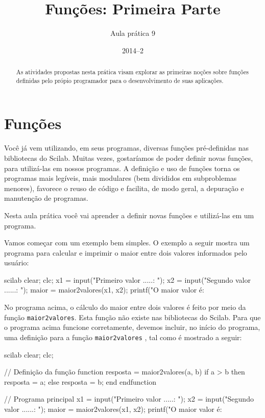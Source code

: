\documentclass[11pt]{practice}
\begin{document}
\subtitle{Aula prática 9}
\title{Funções: Primeira Parte}
\author{}
\date{2014--2}
\maketitle

\begin{abstract}
  As atividades propostas nesta prática visam explorar as primeiras
  noções sobre funções definidas pelo própio programador para o
  desenvolvimento de suas aplicações.
\end{abstract}

\tableofcontents

\section{Funções}

Você já vem utilizando, em seus programas, diversas funções
pré-definidas nas bibliotecas do Scilab. Muitas vezes, gostaríamos de
poder definir novas funções, para utilizá-las em nossos programas. A
definição e uso de funções torna os programas mais legíveis, mais
modulares (bem divididos em subproblemas menores), favorece o reuso de
código e facilita, de modo geral, a depuração e manutenção de programas.

Nesta aula prática você vai aprender a definir novas funções e
utilizá-las em um programa.

Vamos começar com um exemplo bem simples. O exemplo a seguir mostra um
programa para calcular e imprimir o maior entre dois valores informados
pelo usuário:

\begin{lst}{scilab}
clear; clc;
x1 = input("Primeiro valor .....: ");
x2 = input("Segundo valor ......: ");
maior = maior2valores(x1, x2);
printf("O maior valor é: %
\end{lst}

No programa acima, o cálculo do maior entre dois valores é feito por
meio da função \texttt{maior2valores}. Esta função não existe nas
bibliotecas do Scilab. Para que o programa acima funcione corretamente,
devemos incluir, no início do programa, uma definição para a função
\texttt{maior2valores} , tal como é mostrado a seguir:

\begin{lst}{scilab}
clear; clc;

// Definição da função
function resposta = maior2valores(a, b)
    if a > b then
        resposta = a;
    else
        resposta = b;
    end
endfunction

// Programa principal
x1 = input("Primeiro valor .....: ");
x2 = input("Segundo valor ......: ");
maior = maior2valores(x1, x2);
printf("O maior valor é: %
\end{lst}
\end{document}
